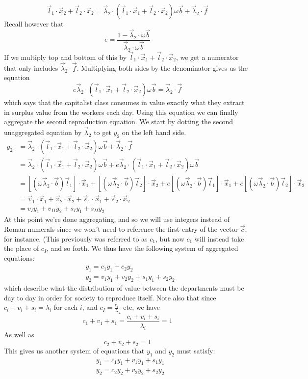 \documentclass{article}
\theoremstyle{definition}
\theoremstyle{plain}
\theoremstyle{theorem}
\begin{document}
\[ \vec{l}_1 \cdot \vec{x}_2 + \vec{l}_2 \cdot \vec{x}_2 = \vec{\lambda}_2 \cdot (\vec{l}_1 \cdot \vec{x}_1 + \vec{l}_2 \cdot \vec{x}_2)\omega \vec{b} + \vec{\lambda}_2 \cdot \vec{f} \]
Recall however that 
\[ e = \frac{1 - \vec{\lambda}_2 \cdot \omega \vec{b}}{\vec{\lambda}_2 \cdot \omega \vec{b}} \]
If we multiply top and bottom of this by $\vec{l}_1 \cdot \vec{x}_1 + \vec{l}_2 \cdot \vec{x}_2$, we get a numerator that only includes $\vec{\lambda}_2 \cdot \vec{f}$. Multiplying both sides by the denominator gives us the equation
\[ e\vec{\lambda}_2 \cdot (\vec{l}_1 \cdot \vec{x}_1 + \vec{l}_2 \cdot \vec{x}_2) \omega \vec{b} = \vec{\lambda}_2 \cdot \vec{f} \]
which says that the capitalist class consumes in value exactly what they extract in surplus value from the workers each day. Using this equation we can finally aggregate the second reproduction equation. We start by dotting the second unaggregated equation by $\vec{\lambda}_2$ to get $y_2$ on the left hand side. 
\begin{align*}
	y_2 &= \vec{\lambda}_2 \cdot (\vec{l}_1 \cdot \vec{x}_1 + \vec{l}_2 \cdot \vec{x}_2)\omega \vec{b} + \vec{\lambda}_2 \cdot \vec{f} \\
	&= \vec{\lambda}_2 \cdot (\vec{l}_1 \cdot \vec{x}_1 + \vec{l}_2 \cdot \vec{x}_2)\omega \vec{b} + e\vec{\lambda}_2 \cdot (\vec{l}_1 \cdot \vec{x}_1 + \vec{l}_2 \cdot \vec{x}_2) \omega \vec{b} \\
	&= [(\omega \vec{\lambda}_2 \cdot \vec{b})\vec{l}_1] \cdot \vec{x}_1 + [(\omega \vec{\lambda}_2 \cdot \vec{b}) \vec{l}_2] \cdot \vec{x}_2 + e[(\omega \vec{\lambda}_2 \cdot \vec{b})\vec{l}_1] \cdot \vec{x}_1 + e[(\omega \vec{\lambda}_2 \cdot \vec{b}) \vec{l}_2] \cdot \vec{x}_2 \\
	&= \vec{v}_1 \cdot \vec{x}_1 + \vec{v}_2 \cdot \vec{x}_2 + \vec{s}_1 \cdot \vec{x}_1 + \vec{s}_2 \cdot \vec{x}_2 \\
	&= v_I y_1 + v_{II}y_2 + s_I y_1 + s_{II} y_2
\end{align*}
At this point we're done aggregating, and so we will use integers instead of Roman numerals since we won't need to reference the first entry of the vector $\vec{c}$, for instance. (This previously was referred to as $c_1$, but now $c_1$ will instead take the place of $c_I$, and so forth. We thus have the following system of aggregated equations:
\begin{align}
	& y_1 = c_1 y_1 + c_2 y_2 \\
	& y_2 = v_1 y_1 + v_2 y_2 + s_1 y_1 + s_2 y_2
\end{align}
which describe what the distribution of value between the departments must be day to day in order for society to reproduce itself. Note also that since $c_i + v_i + s_i = \lambda_i$ for each $i$, and $c_I = \frac{c_i}{\lambda}_i$ etc, we have
\[ c_1 + v_1 + s_1 = \frac{c_i+v_i+s_i}{\lambda_i} = 1 \]
As well as
\[ c_2 + v_2 + s_2 = 1 \]
This gives us another system of equations that $y_1$ and $y_2$ must satisfy:
\begin{align}
	& y_1 = c_1y_1 + v_1 y_1 + s_1 y_1 \\
	& y_2 = c_2 y_2 + v_2 y_2 + s_2 y_2
\end{align} 
\end{document}

